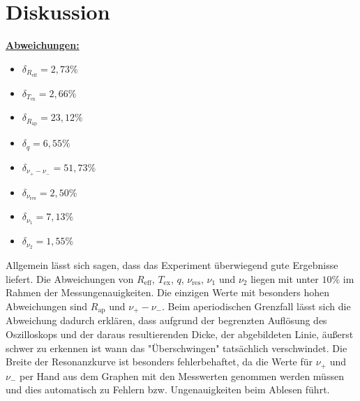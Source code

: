 \newpage
\section{Diskussion}

\textbf{\underline{Abweichungen:}}
\begin{itemize}
  \item[] $\delta_{R_\text{eff}} = 2,73 \%$
  \item[] $\delta_{T_\text{ex}} = 2,66 \%$
  \item[] $\delta_{R_\text{ap}} = 23,12 \%$
  \item[] $\delta_{q} = 6,55 \%$
  \item[] $\delta_{\nu_+ - \nu_-} = 51,73 \%$
  \item[] $\delta_{\nu_\text{res}} = 2,50 \%$
  \item[] $\delta_{\nu_1} = 7,13 \%$
  \item[] $\delta_{\nu_2} = 1,55 \%$
\end{itemize}

Allgemein lässt sich sagen, dass das Experiment überwiegend gute Ergebnisse liefert.
Die Abweichungen von $R_\text{eff}$, $T_\text{ex}$, $q$, $\nu_\text{res}$, $\nu_1$ und $\nu_2$
liegen mit unter $10 \%$ im Rahmen der Messungenauigkeiten.
Die einzigen Werte mit besonders hohen Abweichungen sind $R_\text{ap}$ und $\nu_+ - \nu_-$.
Beim aperiodischen Grenzfall lässt sich die Abweichung dadurch erklären,
dass aufgrund der begrenzten Auflösung des Oszilloskops und der daraus resultierenden Dicke,
der abgebildeten Linie, äußerst schwer zu erkennen ist wann das "Überschwingen" tatsächlich verschwindet.
Die Breite der Resonanzkurve ist besonders fehlerbehaftet,
da die Werte für $\nu_+$ und $\nu_-$ per Hand aus dem Graphen mit den Messwerten genommen werden müssen
und dies automatisch zu Fehlern bzw. Ungenauigkeiten beim Ablesen führt.

